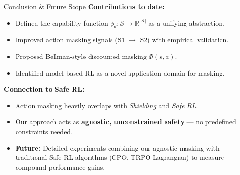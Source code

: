 \documentclass[11pt,aspectratio=169]{beamer}
\begin{document}
\begin{frame}{Conclusion \& Future Scope}
    \textbf{Contributions to date:}
    \begin{itemize}
        \item Defined the capability function $\phi_\theta: \mathcal{S} \rightarrow \mathbb{R}^{|\mathcal{A}|}$ as a unifying abstraction.
        \item Improved action masking signals (S1 $\rightarrow$ S2) with empirical validation.
        \item Proposed Bellman-style discounted masking $\Phi(s, a)$.
        \item Identified model-based RL as a novel application domain for masking.
    \end{itemize}

    \vspace{0.3cm}
    \textbf{Connection to Safe RL:}
    \begin{itemize}
        \item Action masking heavily overlaps with \textit{Shielding} and \textit{Safe RL}.
        \item Our approach acts as \textbf{agnostic, unconstrained safety} — no predefined constraints needed.
        \item \textbf{Future:} Detailed experiments combining our agnostic masking with traditional Safe RL algorithms (CPO, TRPO-Lagrangian) to measure compound performance gains.
    \end{itemize}
\end{frame}
\end{document}
